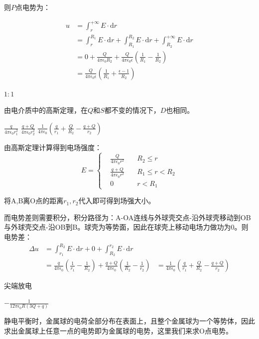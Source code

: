 \documentclass[b5paper,opensource,sourcefont,parskip]{qyxf-book}
\newcommand{\di}[1]{\mathrm{d}#1}
\begin{document}
则$ P $点电势为：

\begin{align*}
u&=\int_r^{+\infty}E\cdot\di{r}\\
&=\int_r^{R_1}E\cdot\di{r}+\int_{R_1}^{R_2}E\cdot\di{r}+\int_{R_2}^{+\infty}E\cdot\di{r}\\
&=0+\frac{Q}{4\pi\epsilon_0 R_2}+\frac{Q}{4\pi\epsilon_0\epsilon}\left(\frac{1}{R_1}-\frac{1}{R_2}\right)\\
&=\frac{Q}{4\pi\epsilon_0\epsilon}\left(\frac{1}{R_1}+\frac{\epsilon-1}{R_2}\right)
\end{align*}

 $1:1$

\solve 由电介质中的高斯定理，在$ Q $和$ S $都不变的情况下，$ D $也相同。

 $\frac{q}{4\pi \epsilon_0 r_1^2}$ \quad $\frac{q+Q}{4\pi\epsilon_0 r_2^2}$ \quad $\frac{1}{4\pi\epsilon_0}\left(\frac{q}{r_1}+\frac{Q}{R_2}-\frac{q+Q}{r_2}\right)$

\solve 由高斯定理计算得到电场强度：
\begin{equation}
E=\left\{
\begin{aligned}
&\frac{Q}{4\pi\epsilon_0 r^2}\quad &R_2\leqslant r\\
&\frac{q+Q}{4\pi\epsilon_0 r^2}\quad &R_1\leqslant r<R_2\\
&0	&r<R_1
\end{aligned}
\right.
\end{equation}

将A,B离O点的距离$ r_1,r_2 $代入即可得到场强大小。

而电势差则需要积分，积分路径为：A-OA连线与外球壳交点-沿外球壳移动到OB与外球壳交点-沿OB到B。球壳为等势面，因此在球壳上移动电场力做功为0。则电势差：
\begin{align*}
\Delta u&=\int_{r_1}^{R_2}E\cdot\di{r}+0+\int_{R_2}^{r_2}E\cdot\di{r}\\
&=\frac{q}{4\pi\epsilon_0}\left(\frac{1}{r_1}-\frac{1}{R_2}\right)+\frac{q+Q}{4\pi\epsilon_0}\left(\frac{1}{R_2}-\frac{1}{r_2}\right)
&=\frac{1}{4\pi\epsilon_0}\left(\frac{q}{r_1}+\frac{Q}{R_2}-\frac{q+Q}{r_2}\right)
\end{align*}

 尖端放电

 $ -\frac{1}{12\pi\epsilon_0 R(3Q+q)} $

\solve 静电平衡时，金属球的电荷全部分布在表面上，且整个金属球为一个等势体，因此求出金属球上任意一点的电势即为金属球的电势，这里我们来求O点电势。
\end{document}
